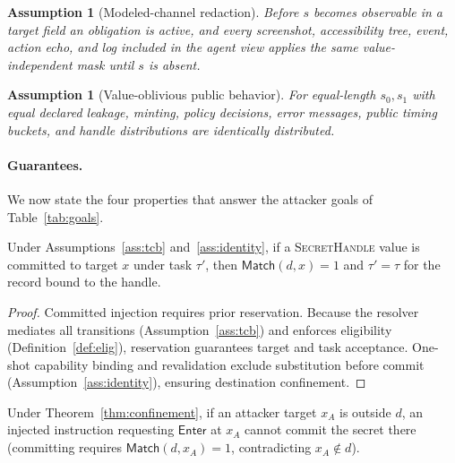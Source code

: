 \documentclass[sigconf,10pt]{acmart}
\newcommand{\SH}{\textsc{SecretHandle}}
\newcommand{\Enter}{\ensuremath{\mathsf{Enter}}}
\newcommand{\Match}{\ensuremath{\mathsf{Match}}}
\theoremstyle{acmplain}%
\newtheorem{assumption}[theorem]{Assumption}%
\begin{document}
\begin{assumption}[Modeled-channel redaction]
\label{ass:redaction}
Before $s$ becomes observable in a target field an obligation is active, and every screenshot, accessibility tree, event, action echo, and log included in the agent view applies the same value-independent mask until $s$ is absent.
\end{assumption}

\begin{assumption}[Value-oblivious public behavior]
\label{ass:oblivious}
For equal-length $s_0,s_1$ with equal declared leakage, minting, policy decisions, error messages, public timing buckets, and handle distributions are identically distributed.
\end{assumption}

\paragraph{Guarantees.} We now state the four properties that answer the attacker goals of Table~\ref{tab:goals}.

\begin{theorem}
\label{thm:confinement}
Under Assumptions~\ref{ass:tcb} and~\ref{ass:identity}, if a \SH{} value is committed to target $x$ under task $\tau'$, then $\Match(d,x)=1$ and $\tau'=\tau$ for the record bound to the handle.
\end{theorem}
\begin{proof}
Committed injection requires prior reservation. Because the resolver mediates all transitions (Assumption~\ref{ass:tcb}) and enforces eligibility (Definition~\ref{def:elig}), reservation guarantees target and task acceptance. One-shot capability binding and revalidation exclude substitution before commit (Assumption~\ref{ass:identity}), ensuring destination confinement.
\end{proof}

\begin{corollary}
\label{cor:redirection}
Under Theorem~\ref{thm:confinement}, if an attacker target $x_A$ is outside $d$, an injected instruction requesting \Enter{} at $x_A$ cannot commit the secret there (committing requires $\Match(d,x_A)=1$, contradicting $x_A\notin d$).
\end{corollary}
\end{document}
